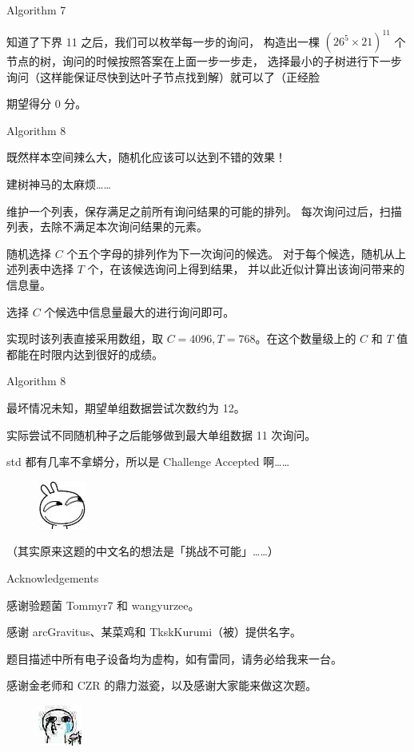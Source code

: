 \documentclass[UTF8]{beamer}
\begin{document}
\begin{frame}{Algorithm 7}

知道了下界 11 之后，我们可以枚举每一步的询问，%
构造出一棵 $(26^5 \times 21)^{11}$ 个节点的树，询问的时候按照答案在上面一步一步走，%
选择最小的子树进行下一步询问（这样能保证尽快到达叶子节点找到解）就可以了（正经脸 \newline\newline

\pause 期望得分 0 分。

\end{frame}

\begin{frame}{Algorithm 8}

既然样本空间辣么大，随机化应该可以达到不错的效果！

\pause
建树神马的太麻烦……

维护一个列表，保存满足之前所有询问结果的可能的排列。%
每次询问过后，扫描列表，去除不满足本次询问结果的元素。

\pause
随机选择 $C$ 个五个字母的排列作为下一次询问的候选。%
对于每个候选，随机从上述列表中选择 $T$ 个，在该候选询问上得到结果，%
并以此近似计算出该询问带来的信息量。

选择 $C$ 个候选中信息量最大的进行询问即可。

\pause
实现时该列表直接采用数组，取 $C = 4096, T = 768$。在这个数量级上的 %
$C$ 和 $T$ 值都能在时限内达到很好的成绩。

\end{frame}

\begin{frame}{Algorithm 8}

最坏情况未知，期望单组数据尝试次数约为 12。

实际尝试不同随机种子之后能够做到最大单组数据 11 次询问。

\pause
std 都有几率不拿蟒分，所以是 Challenge Accepted 啊……

\begin{figure}[h]\centering
\includegraphics[scale=0.5]{zz.jpg}
\end{figure}

（其实原来这题的中文名的想法是「挑战不可能」……）

\end{frame}

\begin{frame}{Acknowledgements}

感谢验题菌 Tommyr7 和 wangyurzee。

感谢 arcGravitus、某菜鸡和 TkskKurumi（被）提供名字。

题目描述中所有电子设备均为虚构，如有雷同，请务必给我来一台。

感谢金老师和 CZR 的鼎力滋瓷，以及感谢大家能来做这次题。

\begin{figure}[h]\centering
\includegraphics[scale=0.015]{ww.jpg}
\end{figure}

\end{frame}
\end{document}
